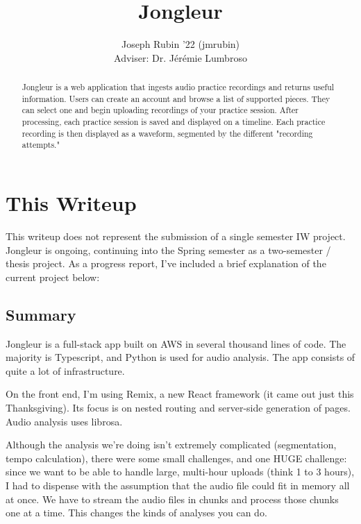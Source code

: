 \documentclass{article}
\begin{document}
\title{Jongleur}

\author{Joseph Rubin '22 (jmrubin)
\\Adviser: Dr. Jérémie Lumbroso}

\date{}
\maketitle

\thispagestyle{empty}


\begin{abstract}
    Jongleur is a web application that ingests audio practice recordings and returns useful information.
    Users can create an account and browse a list of supported pieces.
    They can select one and begin uploading recordings of your practice session.
    After processing, each practice session is saved and displayed on a timeline.
    Each practice recording is then displayed as a waveform, segmented by the different "recording attempts."
\end{abstract}

\newpage

\section{This Writeup}
This writeup does not represent the submission of a single semester IW project.
Jongleur is ongoing, continuing into the Spring semester as a two-semester / thesis project.
As a progress report, I've included a brief explanation of the current project below:

\subsection{Summary}
Jongleur is a full-stack app built on AWS in several thousand lines of code.
The majority is Typescript, and Python is used for audio analysis.
The app consists of quite a lot of infrastructure.

On the front end, I'm using Remix, a new React framework (it came out just this Thanksgiving).
Its focus is on nested routing and server-side generation of pages.
Audio analysis uses librosa.

Although the analysis we're doing isn't extremely complicated (segmentation, tempo calculation), there were some small challenges, and one HUGE challenge: since we want to be able to handle large, multi-hour uploads (think 1 to 3 hours), I had to dispense with the assumption that the audio file could fit in memory all at once. 
We have to stream the audio files in chunks and process those chunks one at a time.
This changes the kinds of analyses you can do.
\end{document}
